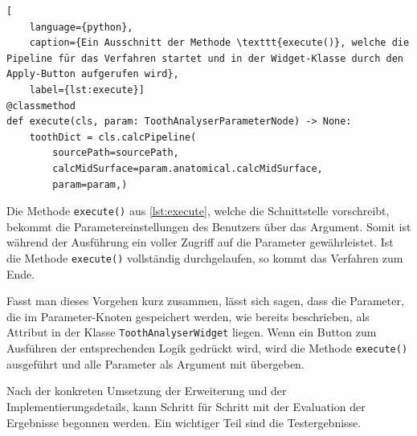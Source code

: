 \begin{lstlisting}[
    language={python},
    caption={Ein Ausschnitt der Methode \texttt{execute()}, welche die Pipeline für das Verfahren startet und in der Widget-Klasse durch den Apply-Button aufgerufen wird},
    label={lst:execute}]
@classmethod
def execute(cls, param: ToothAnalyserParameterNode) -> None:
    toothDict = cls.calcPipeline(
	    sourcePath=sourcePath,
	    calcMidSurface=param.anatomical.calcMidSurface,
	    param=param,)
\end{lstlisting}

Die Methode \texttt{execute()} aus \ref{lst:execute}, welche die Schnittstelle vorschreibt,
bekommt die Parametereinstellungen des Benutzers über das Argument. Somit ist während
der Ausführung ein voller Zugriff auf die Parameter gewährleistet. Ist die
Methode \texttt{execute()} vollständig durchgelaufen, so kommt das Verfahren zum
Ende.

Fasst man dieses Vorgehen kurz zusammen, lässt sich sagen, dass die Parameter, die
im Parameter-Knoten gespeichert werden, wie bereits beschrieben, als Attribut in
der Klasse \texttt{ToothAnalyserWidget} liegen. Wenn ein Button zum Ausführen der
entsprechenden Logik gedrückt wird, wird die Methode \texttt{execute()} ausgeführt
und alle Parameter als Argument mit übergeben.

Nach der konkreten Umsetzung der Erweiterung und der Implementierungsdetails,
kann Schritt für Schritt mit der Evaluation der Ergebnisse begonnen werden. Ein wichtiger
Teil sind die Testergebnisse.
